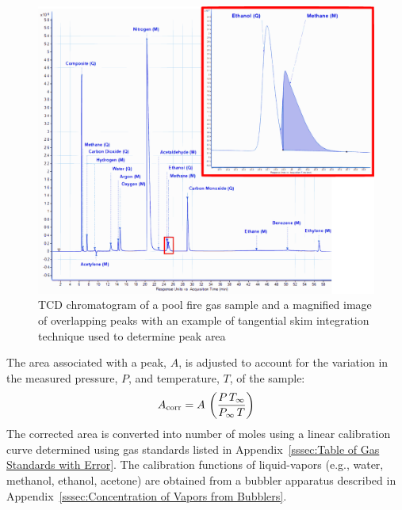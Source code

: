 \documentclass[12pt]{article}
\begin{document}
\begin{figure}[h!]
	\centering
\includegraphics[width=\textwidth,keepaspectratio]{Chromatogram.png}
	\caption[Chromatogram of a pool fire gas sample]{TCD chromatogram of a pool fire gas sample and a magnified image of overlapping peaks with an example of tangential skim integration technique used to determine peak area}
	\label{fig:Chromatogram}
\end{figure}

The area associated with a peak, $A$, is adjusted to account for the variation in the measured pressure, $P$, and temperature, $T$, of the sample:
\begin{equation}\label{eq:Area_corrected}
	A_{\rm corr} = A \, \left(\frac{P \, T_\infty}{P_\infty \, T} \right)
\end{equation}
The corrected area is converted into number of moles using a linear calibration curve determined using gas standards listed in Appendix~\ref{sssec:Table of Gas Standards with Error}. The calibration functions of liquid-vapors (e.g., water, methanol, ethanol, acetone) are obtained from a bubbler apparatus described in Appendix~\ref{sssec:Concentration of Vapors from Bubblers}.
\end{document}
